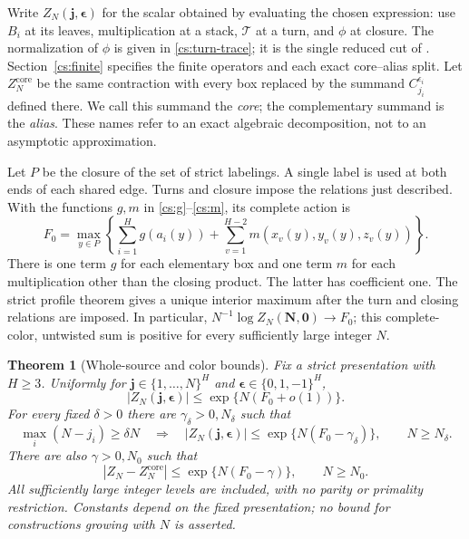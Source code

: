 \documentclass[11pt]{article}
\newtheorem{theorem}{Theorem}[section]
\theoremstyle{remark}\newtheorem{remark}[theorem]{Remark}
\numberwithin{equation}{section}
\newcommand{\Turn}{\mathcal T}
\newcommand{\core}{\mathrm{core}}
\begin{document}
Write \(Z_N(\mathbf j,\boldsymbol\epsilon)\) for the scalar obtained by
evaluating the chosen expression: use $B_i$ at its leaves, multiplication
at a stack, $\Turn$ at a turn, and $\phi$ at closure. The normalization
of $\phi$ is given in \eqref{cs:turn-trace}; it is the single reduced cut
of \cite{Newton}.
Section~\ref{cs:finite} specifies the finite operators and each exact
core--alias split. Let \(Z_N^{\core}\) be the same contraction with
every box replaced by the summand $C_{j_i}^{\epsilon_i}$ defined there.
We call this summand the \emph{core}; the complementary summand is the
\emph{alias}. These names refer to an exact algebraic decomposition,
not to an asymptotic approximation.

Let \(P\) be the closure of the set of strict labelings. A single label
is used at both ends of each shared edge. Turns and closure impose the
relations just described. With the functions \(g,m\) in
\eqref{cs:g}--\eqref{cs:m}, its complete action is
\begin{equation}\label{cs:F0}
 F_0=\max_{y\in P}
 \left\{\sum_{i=1}^{H}g(a_i(y))+
             \sum_{v=1}^{H-2}m(x_v(y),y_v(y),z_v(y))\right\}.
\end{equation}
There is one term $g$ for each elementary box and one term $m$ for
each multiplication other than the closing product. The latter has
coefficient one. The strict profile theorem \cite[Theorem 6.4]{Newton}
gives a unique interior maximum after the turn and closing relations
are imposed. In particular,
$N^{-1}\log Z_N(\mathbf N,\mathbf0)\to F_0$; this complete-color,
untwisted sum is positive for every sufficiently large integer $N$.

\begin{theorem}[Whole-source and color bounds]\label{cs:main}
Fix a strict presentation with \(H\ge3\). Uniformly for
$\mathbf j\in\{1,\ldots,N\}^H$ and
$\boldsymbol\epsilon\in\{0,1,-1\}^H$,
\begin{equation}\label{cs:whole}
 |Z_N(\mathbf j,\boldsymbol\epsilon)|\le\exp\{N(F_0+o(1))\}.
\end{equation}
For every fixed \(\delta>0\) there are \(\gamma_\delta>0,N_\delta\)
such that
\begin{equation}\label{cs:color-gap}
 \max_i(N-j_i)\ge\delta N\quad\Longrightarrow\quad
 |Z_N(\mathbf j,\boldsymbol\epsilon)|
 \le\exp\{N(F_0-\gamma_\delta)\},\qquad N\ge N_\delta.
\end{equation}
There are also \(\gamma>0,N_0\) such that
\begin{equation}\label{cs:alias-gap}
 |Z_N-Z_N^{\core}|\le\exp\{N(F_0-\gamma)\},\qquad N\ge N_0.
\end{equation}
All sufficiently large integer levels are included, with no parity or
primality restriction. Constants depend on the fixed presentation;
no bound for constructions growing with \(N\) is asserted.
\end{theorem}
\end{document}
